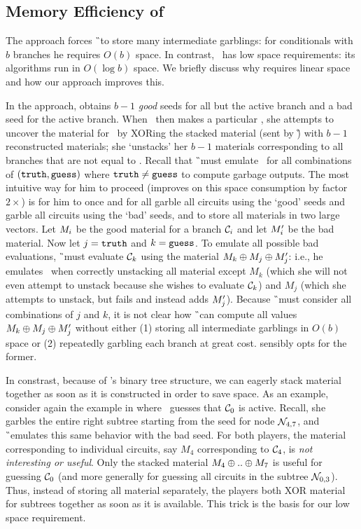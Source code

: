 \subsection{Memory Efficiency of \ourschemelong}
\label{sec:memoryEfficiency}

The \HK approach forces \G\ to store many intermediate
garblings: for conditionals with $b$ branches he requires $O(b)$ space.
In contrast, \ourschemelong\ has low space requirements: its
algorithms run in $O(\log b)$ space.
%
We briefly discuss why \HK requires linear space and how our approach
improves this.

In the \HK approach, \E obtains $b-1$ \emph{good} seeds for all but the
active branch and a bad seed for the active branch.
%
When \E\ then makes a particular \guess, she attempts to uncover the
material for \guess\ by XORing the stacked material (sent by \G) with
$b-1$ reconstructed materials; she `unstacks' her $b-1$ materials
corresponding to all branches that are not equal to \guess.
%
Recall that \G\ must emulate \E\ for all combinations of $(\mathtt{truth},
\mathtt{guess})$ where $\mathtt{truth} \neq \mathtt{guess}$ to compute garbage outputs.
%
The most intuitive way for him to proceed (\HK improves on this space
consumption by factor $2\times$) is for him to once and for all garble all circuits using the `good'
seeds and garble all circuits using the `bad' seeds, and to
store all materials in two large vectors.
Let $M_i$ be the good material for a branch $\mathcal C_i$ and let $M'_i$ be
the bad material.
%
Now let $j = \mathtt{truth}$ and $k = \mathtt{guess}$.
To emulate all possible bad evaluations, \G\ must evaluate $\mathcal C_k$
using the material $M_k \oplus M_j \oplus M_j'$:
i.e., he emulates \E\ when correctly unstacking all material except $M_k$
(which she will not even attempt to unstack because she wishes to
evaluate $\mathcal C_k$) and $M_j$ (which she attempts to unstack, but fails
and instead adds $M_j'$).
%
Because \G\ must consider all combinations of $j$ and $k$, it is not
clear how \G\ can compute all values $M_k \oplus M_j \oplus
M_j'$ without either (1) storing all intermediate garblings in
$O(b)$ space or (2) repeatedly garbling each branch at great cost.
\HK sensibly opts for the former.

In constrast, because of \ourschemelong's binary tree
structure, we can eagerly stack material together as soon as it is constructed
in order to save space.
%
As an example, consider again the example in  where
\E\ guesses that $\mathcal C_0$ is active.
%
Recall, she garbles the entire right subtree starting from the
seed for node $\mathtt{\cal N}_{4, 7}$, and \G\ emulates this same behavior with
the bad seed.
%
For both players, the material corresponding to individual circuits, say
$M_4$ corresponding to $\mathcal C_4$, is \emph{not interesting or useful}.
Only the stacked material $M_4 \oplus .. \oplus M_7$ is useful for
guessing $\mathcal C_0$ (and more generally for guessing all circuits in the subtree
$\mathtt{\cal N}_{0, 3}$).
Thus, instead of storing all material separately, the players both XOR
material for subtrees together as soon as it is available.
This trick is the basis for our low space requirement.

